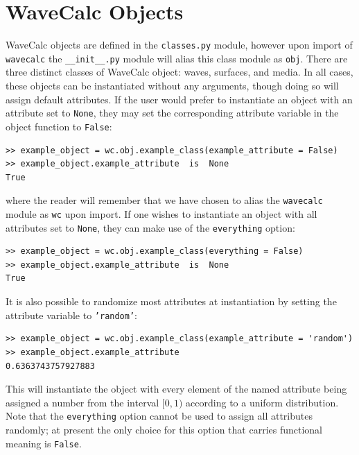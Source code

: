 \documentclass[11pt, reqno]{book}%
\newcounter{ct}
\newcommand{\tw}[1]{{\tt #1}}
\begin{document}
\chapter{WaveCalc Objects}
\label{chap:wavecalcobj}

WaveCalc objects are defined in the \tw{classes.py} module, however upon import of \tw{wavecalc} the \tw{\_\_init\_\_.py} module will alias this class module as \tw{obj}. There are three distinct classes of WaveCalc object: waves, surfaces, and media. In all cases, these objects can be instantiated without any arguments, though doing so will assign default attributes. If the user would prefer to instantiate an object with an attribute set to \tw{None}, they may set the corresponding attribute variable in the object function to \tw{False}:
\begin{verbatim}
>> example_object = wc.obj.example_class(example_attribute = False)
>> example_object.example_attribute  is  None
True
\end{verbatim}
\noindent where the reader will remember that we have chosen to alias the \tw{wavecalc} module as \tw{wc} upon import. If one wishes to instantiate an object with all attributes set to \tw{None}, they can make use of the \tw{everything} option:
\begin{verbatim}
>> example_object = wc.obj.example_class(everything = False)
>> example_object.example_attribute  is  None
True
\end{verbatim}
 \noindent It is also possible to randomize most attributes at instantiation by setting the attribute variable to \tw{'random'}:
\begin{verbatim}
>> example_object = wc.obj.example_class(example_attribute = 'random')
>> example_object.example_attribute
0.6363743757927883
\end{verbatim}
\noindent This will instantiate the object with every element of the named attribute being assigned a number from the interval $[0,1)$ according to a uniform distribution. Note that the \tw{everything} option cannot be used to assign all attributes randomly; at present the only choice for this option that carries functional meaning is \tw{False}.
\end{document}

